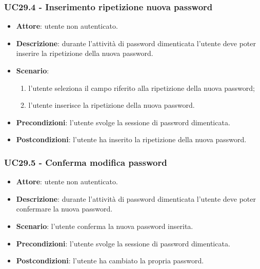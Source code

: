 \subsubsection{UC29.4 - Inserimento ripetizione nuova password}
\begin{itemize}
    \item \textbf{Attore}: utente non autenticato.
    \item \textbf{Descrizione}: durante l'attività di password dimenticata l'utente deve poter inserire la ripetizione della nuova password.
    \item \textbf{Scenario}:
    \begin{enumerate}
        \item l'utente seleziona il campo riferito alla ripetizione della nuova password;
        \item l'utente inserisce la ripetizione della nuova password.
    \end{enumerate}

    \item \textbf{Precondizioni}: l'utente svolge la sessione di password dimenticata.
    \item \textbf{Postcondizioni}: l'utente ha inserito la ripetizione della nuova password.
\end{itemize}

\subsubsection{UC29.5 - Conferma modifica password}
\begin{itemize}
    \item \textbf{Attore}: utente non autenticato.
    \item \textbf{Descrizione}: durante l'attività di password dimenticata l'utente deve poter confermare la nuova password.
    \item \textbf{Scenario}: l'utente conferma la nuova password inserita. 
    \item \textbf{Precondizioni}: l'utente svolge la sessione di password dimenticata.
    \item \textbf{Postcondizioni}: l'utente ha cambiato la propria password.
\end{itemize}

